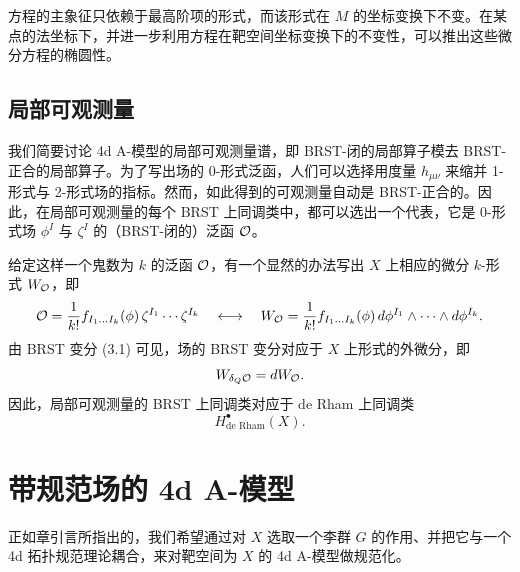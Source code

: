 方程的主象征只依赖于最高阶项的形式，而该形式在 $M$ 的坐标变换下不变。在某点的法坐标下，并进一步利用方程在靶空间坐标变换下的不变性，可以推出这些微分方程的椭圆性。

\subsection{局部可观测量}

我们简要讨论 4d A-模型的局部可观测量谱，即 BRST-闭的局部算子模去 BRST-正合的局部算子。为了写出场的 0-形式泛函，人们可以选择用度量 $h_{\mu\nu}$ 来缩并 1-形式与 2-形式场的指标。然而，如此得到的可观测量自动是 BRST-正合的。因此，在局部可观测量的每个 BRST 上同调类中，都可以选出一个代表，它是 0-形式场 $\phi^I$ 与 $\zeta^I$ 的（BRST-闭的）泛函 $\mathcal{O}$。


给定这样一个鬼数为 $k$ 的泛函 $\mathcal{O}$，有一个显然的办法写出 $X$ 上相应的微分 $k$-形式 $W_{\mathcal{O}}$，即
\[
  \mathcal{O}=\frac{1}{k!}f_{I_1\ldots I_k}(\phi)\,\zeta^{I_1}\cdots\zeta^{I_k}
  \quad\longleftrightarrow\quad
  W_{\mathcal{O}}=\frac{1}{k!}f_{I_1\ldots I_k}(\phi)\,d\phi^{I_1}\wedge\cdots\wedge d\phi^{I_k}.
\]
由 BRST 变分 (3.1) 可见，场的 BRST 变分对应于 $X$ 上形式的外微分，即
\[
  W_{\delta_Q\mathcal{O}}=d W_{\mathcal{O}}.
\]
因此，局部可观测量的 BRST 上同调类对应于 de Rham 上同调类
\[
  H^\bullet_{\text{de Rham}}(X).
\]


\section{带规范场的 4d A-模型}

正如章引言所指出的，我们希望通过对 $X$ 选取一个李群 $G$ 的作用、并把它与一个 4d 拓扑规范理论耦合，来对靶空间为 $X$ 的 4d A-模型做规范化。

